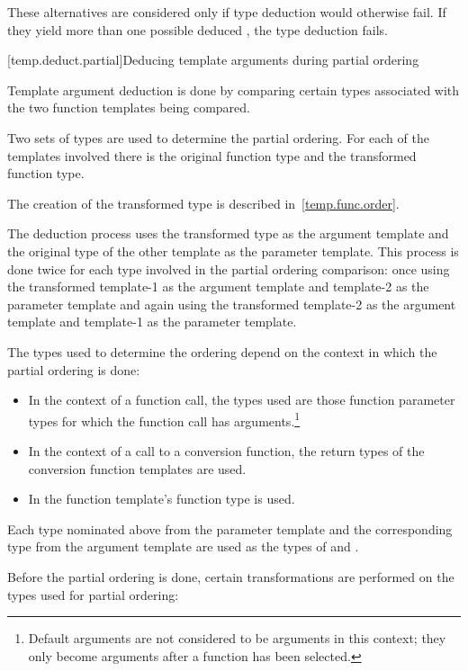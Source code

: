 \pnum
These alternatives are considered only if type deduction would
otherwise fail.
If they yield more than one possible deduced
,
the type deduction fails.

[temp.deduct.partial]{Deducing template arguments during partial ordering}

\pnum
Template argument deduction is done by comparing certain types associated with
the two function templates being compared.

\pnum
Two sets of types are used to determine the partial ordering.  For each of
the templates involved there is the original function type and the
transformed function type.
\begin{note}
The creation of the transformed type is described in~\ref{temp.func.order}.
\end{note}
The deduction process uses the
transformed type as the argument template and the original type of the
other template as the parameter template.  This process is done twice
for each type involved in the partial ordering comparison: once using
the transformed template-1 as the argument template and template-2 as
the parameter template and again using the transformed template-2 as
the argument template and template-1 as the parameter template.

\pnum
The types used to determine the ordering depend on the context in which
the partial ordering is done:

\begin{itemize}
\item
In the context of a function call, the types used are those function parameter types
for which the function call has arguments.\footnote{Default arguments
are not considered to be arguments in this context; they only become arguments
after a function has been selected.}
\item
In the context of a call to a conversion function, the return types of
the conversion function templates are used.
\item
In  the function template's function
type is used.
\end{itemize}

\pnum
Each type nominated above from the parameter template and the corresponding type from the
argument template are used as the types of
and
.

\pnum
Before the partial ordering is done, certain transformations are performed
on the types used for partial ordering:

